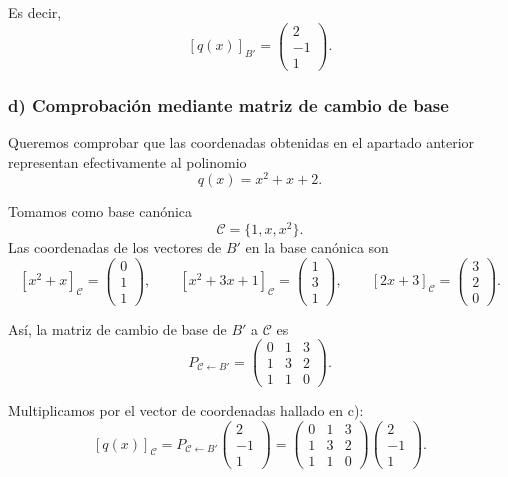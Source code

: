 \documentclass[12pt]{article}
\begin{document}
Es decir,
\[
\boxed{
[q(x)]_{B'}=
\begin{pmatrix}
2\\
-1\\
1
\end{pmatrix}.}
\]

\subsubsection*{d) Comprobación mediante matriz de cambio de base}

Queremos comprobar que las coordenadas obtenidas en el apartado anterior representan efectivamente al polinomio
\[
q(x)=x^2+x+2.
\]

Tomamos como base canónica
\[
\mathcal C=\{1,x,x^2\}.
\]
Las coordenadas de los vectores de \(B'\) en la base canónica son
\[
[x^2+x]_{\mathcal C}=
\begin{pmatrix}
0\\1\\1
\end{pmatrix},
\qquad
[x^2+3x+1]_{\mathcal C}=
\begin{pmatrix}
1\\3\\1
\end{pmatrix},
\qquad
[2x+3]_{\mathcal C}=
\begin{pmatrix}
3\\2\\0
\end{pmatrix}.
\]

Así, la matriz de cambio de base de \(B'\) a \(\mathcal C\) es
\[
P_{\mathcal C\leftarrow B'}=
\begin{pmatrix}
0 & 1 & 3\\
1 & 3 & 2\\
1 & 1 & 0
\end{pmatrix}.
\]

Multiplicamos por el vector de coordenadas hallado en c):
\[
[q(x)]_{\mathcal C}
=
P_{\mathcal C\leftarrow B'}
\begin{pmatrix}
2\\
-1\\
1
\end{pmatrix}
=
\begin{pmatrix}
0 & 1 & 3\\
1 & 3 & 2\\
1 & 1 & 0
\end{pmatrix}
\begin{pmatrix}
2\\
-1\\
1
\end{pmatrix}.
\]
\end{document}
